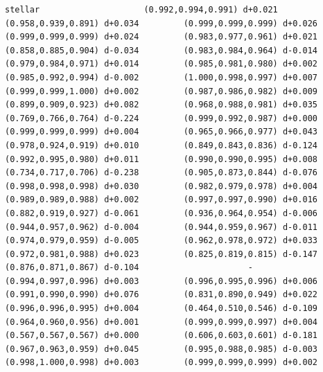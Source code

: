 \documentclass[11pt, letterpaper, openany]{book}
\begin{document}
\begin{empiricalbox}
\begin{lstlisting}[style=terminal]
stellar                     (0.992,0.994,0.991) d+0.021         (0.958,0.939,0.891) d+0.034         (0.999,0.999,0.999) d+0.026         (0.999,0.999,0.999) d+0.024         (0.983,0.977,0.961) d+0.021         (0.858,0.885,0.904) d-0.034         (0.983,0.984,0.964) d-0.014         (0.979,0.984,0.971) d+0.014         (0.985,0.981,0.980) d+0.002         (0.985,0.992,0.994) d-0.002         (1.000,0.998,0.997) d+0.007         (0.999,0.999,1.000) d+0.002         (0.987,0.986,0.982) d+0.009         (0.899,0.909,0.923) d+0.082         (0.968,0.988,0.981) d+0.035         (0.769,0.766,0.764) d-0.224         (0.999,0.992,0.987) d+0.000         (0.999,0.999,0.999) d+0.004         (0.965,0.966,0.977) d+0.043         (0.978,0.924,0.919) d+0.010         (0.849,0.843,0.836) d-0.124         (0.992,0.995,0.980) d+0.011         (0.990,0.990,0.995) d+0.008         (0.734,0.717,0.706) d-0.238         (0.905,0.873,0.844) d-0.076         (0.998,0.998,0.998) d+0.030         (0.982,0.979,0.978) d+0.004         (0.989,0.989,0.988) d+0.002         (0.997,0.997,0.990) d+0.016         (0.882,0.919,0.927) d-0.061         (0.936,0.964,0.954) d-0.006         (0.944,0.957,0.962) d-0.004         (0.944,0.959,0.967) d-0.011         (0.974,0.979,0.959) d-0.005         (0.962,0.978,0.972) d+0.033         (0.972,0.981,0.988) d+0.023         (0.825,0.819,0.815) d-0.147         (0.876,0.871,0.867) d-0.104                      -                      (0.994,0.997,0.996) d+0.003         (0.996,0.995,0.996) d+0.006         (0.991,0.990,0.990) d+0.076         (0.831,0.890,0.949) d+0.022         (0.996,0.996,0.995) d+0.004         (0.464,0.510,0.546) d-0.109         (0.964,0.960,0.956) d+0.001         (0.999,0.999,0.997) d+0.004         (0.567,0.567,0.567) d+0.000         (0.606,0.603,0.601) d-0.181         (0.967,0.963,0.959) d+0.045         (0.995,0.988,0.985) d-0.003         (0.998,1.000,0.998) d+0.003         (0.999,0.999,0.999) d+0.002     

\end{lstlisting}
\end{empiricalbox}
\end{document}
